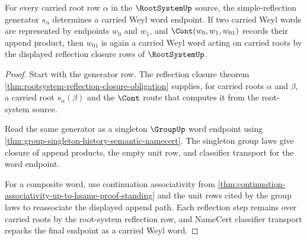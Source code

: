 \begin{theorem}
\label{thm:weylgroup-simple-reflection-word-closure-row}
For every carried root row $\alpha$ in the $\RootSystemUp$ source, the
simple-reflection generator $s_\alpha$ determines a carried Weyl word endpoint.
If two carried Weyl words are represented by endpoints $w_0$ and $w_1$, and
$\Cont(w_0,w_1,w_{01})$ records their append product, then $w_{01}$ is again a
carried Weyl word acting on carried roots by the displayed reflection closure
rows of $\RootSystemUp$.
\end{theorem}
\begin{proof}
Start with the generator row. The reflection closure theorem
\autoref{thm:rootsystem-reflection-closure-obligation} supplies, for carried
roots $\alpha$ and $\beta$, a carried root $s_\alpha(\beta)$ and the $\Cont$
route that computes it from the root-system source.

Read the same generator as a singleton $\GroupUp$ word endpoint using
\autoref{thm:group-singleton-history-semantic-namecert}. The singleton group
laws give closure of append products, the empty unit row, and classifier
transport for the word endpoint.

For a composite word, use continuation associativity from
\autoref{thm:continuation-associativity-up-to-hsame-proof-standing} and the
unit rows cited by the group laws to reassociate the displayed append path.
Each reflection step remains over carried roots by the root-system reflection
row, and NameCert classifier transport repacks the final endpoint as a carried
Weyl word.
\end{proof}

